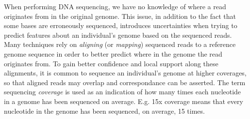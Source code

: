 When performing DNA sequencing, we have no knowledge of where a read originates from in the original genome.
This issue, in addition to the fact that some bases are erroneously sequenced, introduces uncertainties when trying to predict features about an individual's genome based on the sequenced reads.
Many techniques rely on \textit{aligning} (or \textit{mapping}) sequenced reads to a reference genome sequence in order to better predict where in the genome the read originates from.
To gain better confidence and local support along these alignments, it is common to sequence an individual's genome at higher coverages, so that aligned reads may overlap and correspondance can be asserted.
The term sequencing \textit{coverage} is used as an indication of how many times each nucleotide in a genome has been sequenced on average.
E.g. 15x coverage means that every nucleotide in the genome has been sequenced, on average, 15 times.

